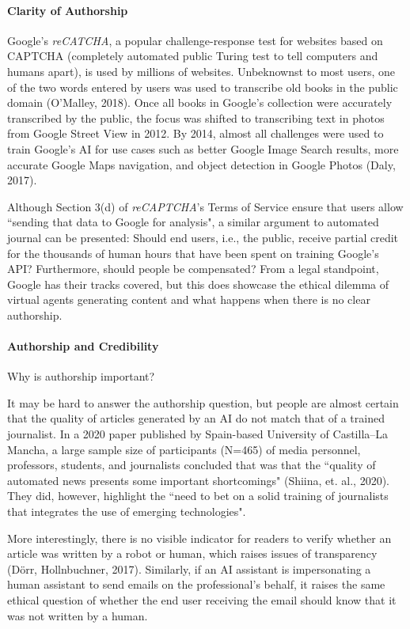 \documentclass{article}
\begin{document}
\paragraph{Clarity of Authorship}

Google's \emph{reCATCHA}, a popular challenge-response test for websites based on CAPTCHA (completely automated public Turing test to tell computers and humans apart), is used by millions of websites. Unbeknownst to most users, one of the two words entered by users was used to transcribe old books in the public domain (O'Malley, 2018). Once all books in Google's collection were accurately transcribed by the public, the focus was shifted to transcribing text in photos from Google Street View in 2012. By 2014, almost all challenges were used to train Google's AI for use cases such as better Google Image Search results, more accurate Google Maps navigation, and object detection in Google Photos (Daly, 2017).

Although Section 3(d) of \emph{reCAPTCHA}'s Terms of Service ensure that users allow ``sending that data to Google for analysis", a similar argument to automated journal can be presented: Should end users, i.e., the public, receive partial credit for the thousands of human hours that have been spent on training Google's API? Furthermore, should people be compensated? From a legal standpoint, Google has their tracks covered, but this does showcase the ethical dilemma of virtual agents generating content and what happens when there is no clear authorship.

\paragraph{Authorship and Credibility}

Why is authorship important?

It may be hard to answer the authorship question, but people are almost certain that the quality of articles generated by an AI do not match that of a trained journalist. In a 2020 paper published by Spain-based University of Castilla–La Mancha, a large sample size of participants (N=465) of media personnel, professors, students, and journalists concluded that was that the ``quality of automated news presents some important shortcomings" (Shiina, et. al., 2020). They did, however, highlight the ``need to bet on a solid training of journalists that integrates the use of emerging technologies".

More interestingly, there is no visible indicator for readers to verify whether an article was written by a robot or human, which raises issues of transparency (Dörr, Hollnbuchner, 2017). Similarly, if an AI assistant is impersonating a human assistant to send emails on the professional's behalf, it raises the same ethical question of whether the end user receiving the email should know that it was not written by a human.
\end{document}
